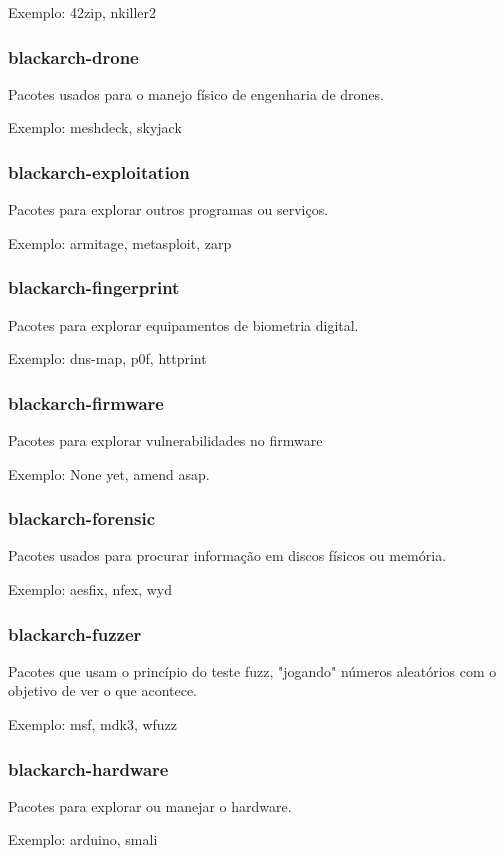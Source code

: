 \documentclass[a4paper, oneside, 11pt]{book}
\begin{document}
Exemplo: 42zip, nkiller2

\subsubsection{blackarch-drone}
Pacotes usados para o manejo físico de engenharia de drones.

Exemplo: meshdeck, skyjack

\subsubsection{blackarch-exploitation}
Pacotes para explorar outros programas ou serviços.

Exemplo: armitage, metasploit, zarp

\subsubsection{blackarch-fingerprint}
Pacotes para explorar equipamentos de biometria digital.

Exemplo: dns-map, p0f, httprint

\subsubsection{blackarch-firmware}
Pacotes para explorar vulnerabilidades no firmware

Exemplo: None yet, amend asap.

\subsubsection{blackarch-forensic}
Pacotes usados para procurar informação em discos físicos ou memória.

Exemplo: aesfix, nfex, wyd

\subsubsection{blackarch-fuzzer}
Pacotes que usam o princípio do teste fuzz, "jogando" números aleatórios com o objetivo de ver o que acontece.

Exemplo: msf, mdk3, wfuzz

\subsubsection{blackarch-hardware}
Pacotes para explorar ou manejar o hardware.

Exemplo: arduino, smali
\end{document}
